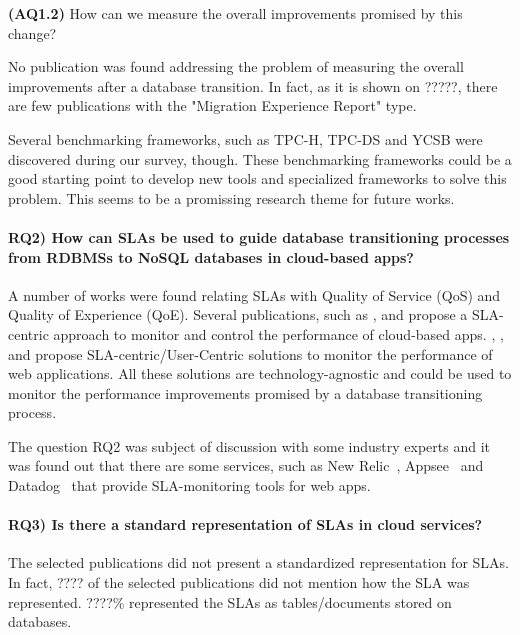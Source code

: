 \documentclass{article}
\begin{document}
{\begin{enumerate}
\end{enumerate}


{\textbf{(AQ1.2)} How can we measure the overall improvements promised by this change?

No publication was found addressing the problem of measuring the overall improvements after a database transition. In fact, as it is shown on ?????, there are few publications with the "Migration Experience Report"  type. 

Several benchmarking frameworks, such as TPC-H, TPC-DS and YCSB were discovered\cite{6616442} during our survey, though. These benchmarking frameworks could be a good starting point to develop new tools and specialized frameworks to solve this problem. This seems to be a promissing research theme for future works.

\paragraph*{\textbf{RQ2)} How can SLAs be used to guide database transitioning processes from RDBMSs to NoSQL databases in cloud-based apps? }

A number of works were found relating SLAs with Quality of Service (QoS) and Quality of Experience (QoE). Several publications, such as \cite{Xiong:2012:DMR:2213598.2213614}, \cite{Konstantinou:2012:TEN:2213836.2213943} and \cite{Klems:2012:RQM:2477172.2477488} propose a SLA-centric approach to monitor and control the performance of cloud-based apps. 
\cite{6253526}, \cite{6461875}, \cite{6511780} and \cite{Xiong:2011:APA:2038916.2038931} propose SLA-centric/User-Centric solutions to monitor the performance of web applications. All these solutions are technology-agnostic and could be used to monitor the performance improvements promised by a database transitioning process.

The question RQ2 was subject of discussion with some industry experts and it was found out that there are some services, such as New Relic~\cite{newrelic}, Appsee~\cite{appsee} and Datadog~\cite{datadog} that provide SLA-monitoring tools for web apps.


\paragraph*{\textbf{RQ3)} Is there a standard representation of SLAs in cloud services? }

The selected publications did not present a standardized representation for SLAs. In fact, ???? of the selected publications did not mention how the SLA was represented. ????\% represented the SLAs as tables/documents stored on databases.

}}
\end{document}
